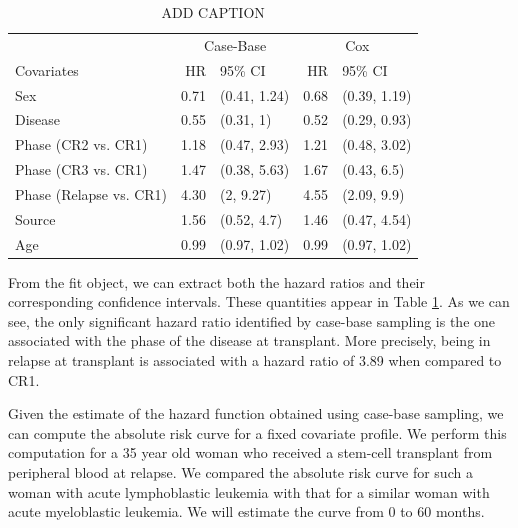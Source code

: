 \documentclass[
]{jss}
\begin{document}
\begin{CodeChunk}
\begin{table}

\caption{\label{tab:bmtcrr-cis}ADD CAPTION}
\centering
\begin{tabular}[t]{lrlrl}
\toprule
\multicolumn{1}{c}{ } & \multicolumn{2}{c}{Case-Base} & \multicolumn{2}{c}{Cox} \\
\cmidrule(l{3pt}r{3pt}){2-3} \cmidrule(l{3pt}r{3pt}){4-5}
Covariates & HR & 95\% CI & HR & 95\% CI\\
\midrule
Sex & 0.71 & (0.41, 1.24) & 0.68 & (0.39, 1.19)\\
Disease & 0.55 & (0.31, 1) & 0.52 & (0.29, 0.93)\\
Phase (CR2 vs. CR1) & 1.18 & (0.47, 2.93) & 1.21 & (0.48, 3.02)\\
Phase (CR3 vs. CR1) & 1.47 & (0.38, 5.63) & 1.67 & (0.43, 6.5)\\
Phase (Relapse vs. CR1) & 4.30 & (2, 9.27) & 4.55 & (2.09, 9.9)\\
\addlinespace
Source & 1.56 & (0.52, 4.7) & 1.46 & (0.47, 4.54)\\
Age & 0.99 & (0.97, 1.02) & 0.99 & (0.97, 1.02)\\
\bottomrule
\end{tabular}
\end{table}

\end{CodeChunk}

From the fit object, we can extract both the hazard ratios and their
corresponding confidence intervals. These quantities appear in Table
\ref{tab:bmtcrr-cis}. As we can see, the only significant hazard ratio
identified by case-base sampling is the one associated with the phase of
the disease at transplant. More precisely, being in relapse at
transplant is associated with a hazard ratio of 3.89 when compared to
CR1.

Given the estimate of the hazard function obtained using case-base
sampling, we can compute the absolute risk curve for a fixed covariate
profile. We perform this computation for a 35 year old woman who
received a stem-cell transplant from peripheral blood at relapse. We
compared the absolute risk curve for such a woman with acute
lymphoblastic leukemia with that for a similar woman with acute
myeloblastic leukemia. We will estimate the curve from 0 to 60 months.
\end{document}
